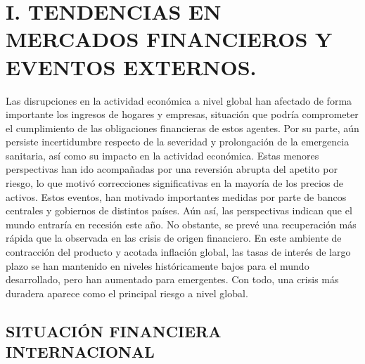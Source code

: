 \documentclass[
]{book}
\begin{document}
\hypertarget{MFLE}{%
\chapter*{I. TENDENCIAS EN MERCADOS FINANCIEROS Y EVENTOS EXTERNOS.}\label{MFLE}}

Las disrupciones en la actividad económica a nivel global han afectado de
forma importante los ingresos de hogares y empresas, situación que podría
comprometer el cumplimiento de las obligaciones financieras de estos agentes.
Por su parte, aún persiste incertidumbre respecto de la severidad y prolongación
de la emergencia sanitaria, así como su impacto en la actividad económica.
Estas menores perspectivas han ido acompañadas por una reversión abrupta del
apetito por riesgo, lo que motivó correcciones significativas en la mayoría de los
precios de activos. Estos eventos, han motivado importantes medidas por parte
de bancos centrales y gobiernos de distintos países. Aún así, las perspectivas
indican que el mundo entraría en recesión este año. No obstante, se prevé una
recuperación más rápida que la observada en las crisis de origen financiero. En
este ambiente de contracción del producto y acotada inflación global, las tasas
de interés de largo plazo se han mantenido en niveles históricamente bajos
para el mundo desarrollado, pero han aumentado para emergentes. Con todo,
una crisis más duradera aparece como el principal riesgo a nivel global.

\hypertarget{SFI}{%
\section*{SITUACIÓN FINANCIERA INTERNACIONAL}\label{SFI}}
\end{document}
